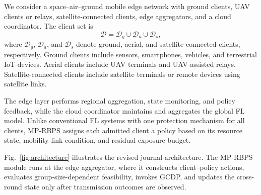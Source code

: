 \documentclass[preprint,12pt]{elsarticle}
\begin{document}
We consider a space--air--ground mobile edge network with ground clients, UAV clients or relays, satellite-connected clients, edge aggregators, and a cloud coordinator. The client set is
\begin{equation}
	\mathcal{D} = \mathcal{D}_{g} \cup \mathcal{D}_{a} \cup \mathcal{D}_{s},
\end{equation}
where $\mathcal{D}_{g}$, $\mathcal{D}_{a}$, and $\mathcal{D}_{s}$ denote ground, aerial, and satellite-connected clients, respectively. Ground clients include sensors, smartphones, vehicles, and terrestrial IoT devices. Aerial clients include UAV terminals and UAV-assisted relays. Satellite-connected clients include satellite terminals or remote devices using satellite links.

The edge layer performs regional aggregation, state monitoring, and policy feedback, while the cloud coordinator maintains and aggregates the global FL model. Unlike conventional FL systems with one protection mechanism for all clients, MP-RBPS assigns each admitted client a policy based on its resource state, mobility-link condition, and residual exposure budget.

Fig.~\ref{fig:architecture} illustrates the revised journal architecture. The MP-RBPS module runs at the edge aggregator, where it constructs client--policy actions, evaluates group-size-dependent feasibility, invokes GCDP, and updates the cross-round state only after transmission outcomes are observed.
\end{document}
